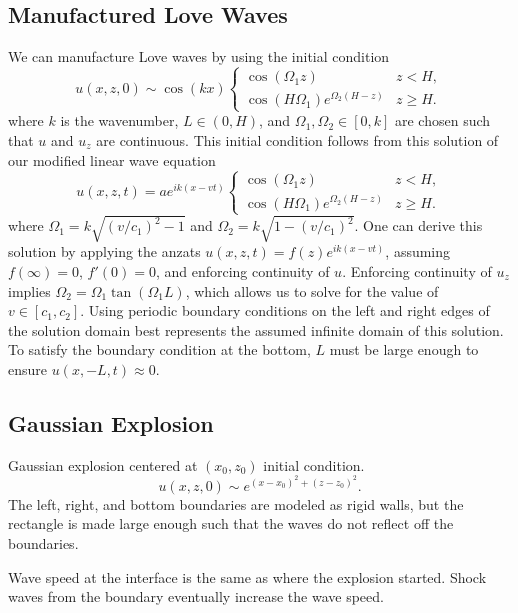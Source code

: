 \documentclass[11pt,letter,subeqn,fleqn]{article}
\numberwithin{equation}{section}
\numberwithin{table}{section}
\numberwithin{figure}{section}
\begin{document}
\subsection{Manufactured Love Waves}

We can manufacture Love waves by using the initial condition
\[
	u(x,z,0) \sim \cos(kx)
	\begin{cases}
		\cos(\Omega_1z)                    & z < H,    \\
		\cos(H\Omega_1)e^{\Omega_2(H-z)} & z \geq H.
	\end{cases}
\]
where $k$ is the wavenumber, $L\in(0,H)$, and $\Omega_1,\Omega_2\in[0,k]$ are chosen such that $u$ and $u_z$ are continuous.
This initial condition follows from this solution of our modified linear wave equation
\[
	u(x,z,t) = ae^{ik(x-vt)}
	\begin{cases}
		\cos(\Omega_1z)                    & z < H,    \\
		\cos(H\Omega_1)e^{\Omega_2(H-z)} & z \geq H.
	\end{cases}
\]
where $\Omega_1 = k\sqrt{(v/c_1)^2-1}$ and $\Omega_2 = k\sqrt{1-(v/c_1)^2}$. One can derive this solution by applying
the anzats $u(x,z,t) = f(z)e^{ik(x-vt)}$, assuming $f(\infty) = 0$, $f'(0)=0$, and enforcing continuity of $u$.
Enforcing continuity of $u_z$ implies $\Omega_2 = \Omega_1\tan(\Omega_1L)$, which allows us to solve for the value
of $v\in[c_1, c_2]$. Using periodic boundary conditions on the left and right edges of the solution domain
best represents the assumed infinite domain of this solution. To satisfy the boundary condition at the bottom,
$L$ must be large enough to ensure $u(x,-L,t)\approx0$.










\subsection{Gaussian Explosion}
Gaussian explosion centered at $(x_0,z_0)$ initial condition.
\[
	u(x,z,0) \sim e^{(x-x_0)^2+(z-z_0)^2}.
\]
The left, right, and bottom boundaries are modeled as rigid walls, but the
rectangle is made large enough such that the waves do not reflect off the boundaries.

Wave speed at the interface is the same as where the explosion started.
Shock waves from the boundary eventually increase the wave speed.
\end{document}
